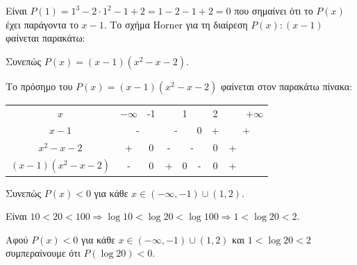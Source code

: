 \begin{alist}
\item Είναι $P(1) = 1^3 - 2 \cdot 1^2 - 1 + 2 = 1 - 2 - 1 + 2 = 0$ που σημαίνει ότι το $P(x)$ έχει παράγοντα το $x - 1$. Το σχήμα Horner για τη διαίρεση $P(x) : (x - 1)$ φαίνεται παρακάτω:
\begin{center}
\Horner
\end{center}
Συνεπώς $P(x) = (x - 1)(x^2 - x - 2)$.
\item Το πρόσημο του $P(x) = (x - 1)(x^2 - x - 2)$ φαίνεται στον παρακάτω πίνακα:
\begin{center}
\begin{tabular}{|c|c|c|c|c|c|c|c|c|}

$x$ & $-\infty$ & -1 & & 1 & & 2 & & $+\infty$ \\ 
$x - 1$ & \multicolumn{2}{c|}{-} & \multicolumn{2}{c|}{-} & 0 & + & \multicolumn{2}{c|}{+} \\ 
$x^2 - x - 2$ & + & 0 & - & \multicolumn{2}{c|}{-} & 0 & + \\ 
$(x - 1)(x^2 - x - 2)$ & - & 0 & + & 0 & - & 0 & + \\ 
\end{tabular}
\end{center}
Συνεπώς $P(x) < 0$ για κάθε $x \in (-\infty, -1) \cup (1, 2)$.
\item Είναι $10 < 20 < 100 \Rightarrow \log 10 < \log 20 < \log 100 \Rightarrow 1 < \log 20 < 2$.
\item Αφού $P(x) < 0$ για κάθε $x \in (-\infty, -1) \cup (1, 2)$ και $1 < \log 20 < 2$ συμπεραίνουμε ότι $P(\log 20) < 0$.
\end{alist}


